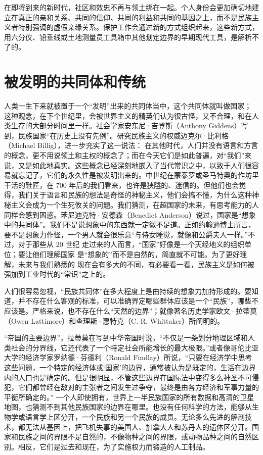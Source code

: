 在即将到来的新时代，社区和效忠不再与领土绑在一起。个人身份会更加确切地建立在真正的亲和关系、共同的信仰、共同的利益和共同的基因之上，而不是民族主义者特别强调的虚假亲缘关系。保护工作会通过新的方式组织起来，这些新方式，用六分仪、铅垂线或土地测量员工具箱中其他划定边界的早期现代工具，是解析不了的。

\section{被发明的共同体和传统}

人类一生下来就被置于一个“发明”出来的共同体当中，这个共同体就叫做国家； 这种观念，在下个世纪里，会被世界主义的精英们认为很古怪，又不合理，和在人类生存的大部分时间里一样。社会学家安东尼·吉登斯（Anthony Giddens）写到，民族国家“在历史上没有先例”。研究民族主义的权威迈克尔·比利格（Michael Billig），进一步充实了这一说法： 在其他时代，人们并没有语言和方言的概念，更不用说领土和主权的概念了；而在今天它们是如此普遍，对“我们”来说，又是如此地真实。这些概念已经深刻地嵌入了当代常识之中，以致于人们很容易就忘记了，它们的永久性是被发明出来的。中世纪在蒙泰罗或圣马特奥的作坊里干活的鞋匠，在 700 年后的我们看来，也许是狭隘的、迷信的。但他们也会觉得，我们关于语言和民族的想法是奇怪的神秘主义，他们会搞不懂，为什么这种神秘主义会成为一个生死攸关的问题。我们猜测，在超国家的未来，有思考能力的人同样会感到困惑。苯尼迪克特·安德森（Benedict Anderson）说过，国家是“想象中的共同体”。我们不是说想象中的东西就一定微不足道。正如约翰逊博士所言，要不是想象力作怪，一个男人就会很乐意“与侍女睡觉，就像和公爵夫人一样。”不过，对于那些从 20 世纪 走过来的人而言，“国家”好像是一个天经地义的组织单位；要让他们理解国家 是“想象的”而不是自然的，简直就不可能。为了更好理解，未来与我们熟悉的  现在会有多大的不同，有必要看一看，民族主义是如何被强加到工业时代的“常识”之上的。

人们很容易忽视，“民族共同体”在多大程度上是由持续的想象力加持形成的。要知道，并不存在什么客观的标准，可以准确界定哪些群体应该是一个“民族”，哪些不应该是。严格来说，也不存在什么“天然的边界”；就像著名历史学家欧文·拉蒂莫（Owen Lattimore）和查理斯·惠特克（C. R. Whittaker）所阐明的。

“帝国的主要边界”，拉蒂莫在写到中华帝国时说，“不仅是一条划分地理区域和人类社会的分界线，它还代表了一个特定社会所能增长的最大极限。”或者像哥伦比亚大学的经济学家罗纳德·芬德利（Ronald Findlay）所说，“只要在经济学中思考这些问题，一个特定的经济体或‘国家’的边界，通常被认为是既定的，生活在边界内的人口也是确定的。但是很明显，不管这些边界在国际法中变得多么神圣不可侵犯，它们都曾经在敌对的主张者之间发生过争夺，最终是由各方经济和军事力量的平衡所确定的。” 一个人即使拥有，世界上一半民族国家的所有数据和高清的卫星地图，也猜测不到其他民族国家的边界在哪里。也没有任何科学的方法，能够从生物学或语言学上区分开，一个民族和另一个民族的成员。无论多么先进的解剖技术，都无法从基因上，把飞机失事的美国人、加拿大人和苏丹人的遗体区分开。国家和民族之间的界限不是自然的，不像物种之间的界限，或动物品种之间的自然区别。相反，它们是过去和现在，为了实施权力而锻造的人工制品。

